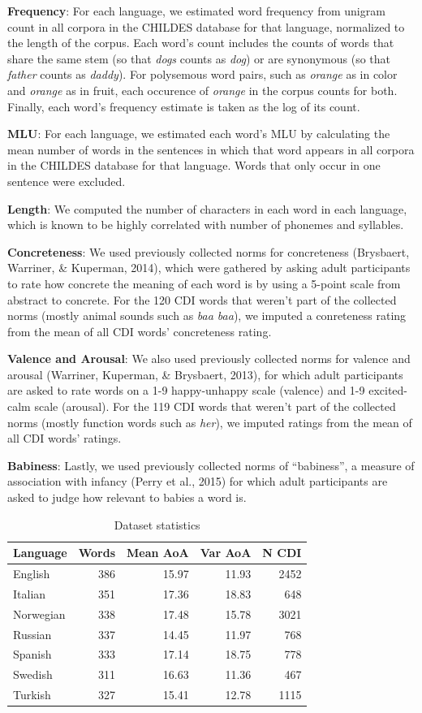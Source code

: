 \documentclass[10pt, letterpaper]{article}
\begin{document}
\textbf{Frequency}: For each language, we estimated word frequency from
unigram count in all corpora in the CHILDES database for that language,
normalized to the length of the corpus. Each word's count includes the
counts of words that share the same stem (so that \emph{dogs} counts as
\emph{dog}) or are synonymous (so that \emph{father} counts as
\emph{daddy}). For polysemous word pairs, such as \emph{orange} as in
color and \emph{orange} as in fruit, each occurence of \emph{orange} in
the corpus counts for both. Finally, each word's frequency estimate is
taken as the log of its count.

\textbf{MLU}: For each language, we estimated each word's MLU by
calculating the mean number of words in the sentences in which that word
appears in all corpora in the CHILDES database for that language. Words
that only occur in one sentence were excluded.

\textbf{Length}: We computed the number of characters in each word in
each language, which is known to be highly correlated with number of
phonemes and syllables.

\textbf{Concreteness}: We used previously collected norms for
concreteness (Brysbaert, Warriner, \& Kuperman, 2014), which were
gathered by asking adult participants to rate how concrete the meaning
of each word is by using a 5-point scale from abstract to concrete. For
the 120 CDI words that weren't part of the collected norms (mostly
animal sounds such as \emph{baa baa}), we imputed a conreteness rating
from the mean of all CDI words' concreteness rating.

\textbf{Valence and Arousal}: We also used previously collected norms
for valence and arousal (Warriner, Kuperman, \& Brysbaert, 2013), for
which adult participants are asked to rate words on a 1-9 happy-unhappy
scale (valence) and 1-9 excited-calm scale (arousal). For the 119 CDI
words that weren't part of the collected norms (mostly function words
such as \emph{her}), we imputed ratings from the mean of all CDI words'
ratings.

\textbf{Babiness}: Lastly, we used previously collected norms of
``babiness'', a measure of association with infancy (Perry et al., 2015)
for which adult participants are asked to judge how relevant to babies a
word is.

\begin{table}[t]
\centering
\begin{tabular}{lrrrr}
  \hline
Language & Words & Mean AoA & Var AoA & N CDI \\ 
  \hline
English & 386 & 15.97 & 11.93 & 2452 \\ 
  Italian & 351 & 17.36 & 18.83 & 648 \\ 
  Norwegian & 338 & 17.48 & 15.78 & 3021 \\ 
  Russian & 337 & 14.45 & 11.97 & 768 \\ 
  Spanish & 333 & 17.14 & 18.75 & 778 \\ 
  Swedish & 311 & 16.63 & 11.36 & 467 \\ 
  Turkish & 327 & 15.41 & 12.78 & 1115 \\ 
   \hline
\end{tabular}
\caption{Dataset statistics} 
\end{table}
\end{document}
